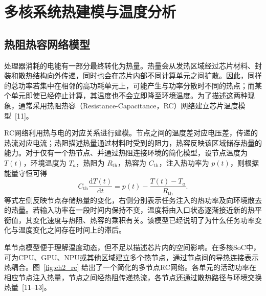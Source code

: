 \section{多核系统热建模与温度分析}

\subsection{热阻热容网络模型}

处理器消耗的电能有一部分最终转化为热量。热量会从发热区域经过芯片材料、封装和散热结构向外传递，同时也会在芯片内部不同计算单元之间扩散。因此，同样的总功率若集中在相邻的高功耗单元上，可能产生与功率分散时不同的热点；而某个单元即使已经停止计算，其温度也不会立即降至环境温度。为了描述这两种现象，通常采用热阻热容（Resistance-Capacitance，RC）网络建立芯片温度模型~[11]。

RC网络利用热与电的对应关系进行建模。节点之间的温度差对应电压差，传递的热流对应电流；热阻描述热量通过材料时受到的阻力，热容反映该区域储存热量的能力。对于仅有一个热节点、并通过热阻连接环境的简化模型，设节点温度为 $T(t)$，环境温度为 $T_a$，热阻为 $R_{\mathrm{th}}$，热容为 $C_{\mathrm{th}}$，注入热功率为 $p(t)$，则根据能量守恒可得
\begin{equation}\label{eq:ch2-rc-one}
 C_{\mathrm{th}}\frac{\mathrm{d}T(t)}{\mathrm{d}t}
 =p(t)-\frac{T(t)-T_a}{R_{\mathrm{th}}}.
\end{equation}
等式左侧反映节点存储热量的变化，右侧分别表示任务注入的热功率及向环境散去的热量。若输入功率在一段时间内保持不变，温度将由入口状态逐渐接近新的热平衡值，其变化速度与热阻、热容的乘积有关。该模型已经说明了为什么任务功率变化与温度变化之间存在时间上的滞后。

单节点模型便于理解温度动态，但不足以描述芯片内的空间影响。在多核SoC中，可为CPU、GPU、NPU或其他区域建立多个热节点，通过节点间的导热连接表示热耦合。图~\ref{fig:ch2_rc} 给出了一个简化的多节点RC网络。各单元的活动功率在相应节点注入热量，节点之间经热阻传递热流，各节点还通过散热路径与环境交换热量~[11--13]。

